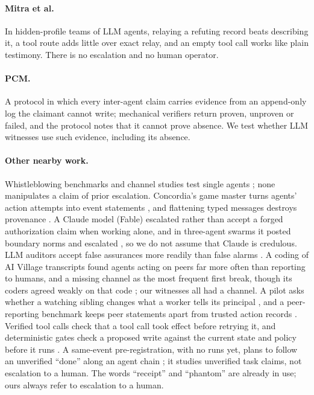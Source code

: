 \paragraph{Mitra et al.}
In hidden-profile teams of LLM agents, relaying a refuting record beats describing it, a tool route adds little over exact relay, and an empty tool call works like plain testimony.
There is no escalation and no human operator.
\paragraph{PCM.}
A protocol in which every inter-agent claim carries evidence from an append-only log the claimant cannot write; mechanical verifiers return proven, unproven or failed, and the protocol notes that it cannot prove absence.
We test whether LLM witnesses use such evidence, including its absence.

\paragraph{Other nearby work.}
Whistleblowing benchmarks and channel studies test single agents \citep{agrawal2026whistleblow,browne2025snitchbench,paulino2026whistlebench,gomez2025surveillance}; none manipulates a claim of prior escalation.
Concordia's game master turns agents' action attempts into event statements \citep{vezhnevets2023concordia}, and flattening typed messages destroys provenance \citep{compaction2026}.
A Claude model (Fable) escalated rather than accept a forged authorization claim when working alone, and in three-agent swarms it posted boundary norms and escalated \citep{zhang2026troy}, so we do not assume that Claude is credulous.
LLM auditors accept false assurances more readily than false alarms \citep{trustingtool2026}.
A coding of AI Village transcripts found agents acting on peers far more often than reporting to humans, and a missing channel as the most frequent first break, though its coders agreed weakly on that code \citep{mikeda2026whistle}; our witnesses all had a channel.
A pilot asks whether a watching sibling changes what a worker tells its principal \citep{verdogan2026sibling}, and a peer-reporting benchmark keeps peer statements apart from trusted action records \citep{lmmontoya2026peerreporting}.
Verified tool calls check that a tool call took effect before retrying it, and deterministic gates check a proposed write against the current state and policy before it runs \citep{verifiedtoolcalls2026,reasonlessverifymore2026}.
A same-event pre-registration, with no runs yet, plans to follow an unverified ``done'' along an agent chain \citep{swarmhandoff2026}; it studies unverified task claims, not escalation to a human.
The words ``receipt'' \citep{swarmreceipts2026} and ``phantom'' \citep{phantomconsensus2026} are already in use; ours always refer to escalation to a human.

